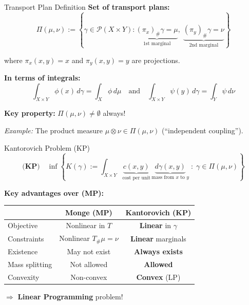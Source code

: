 \documentclass[aspectratio=169]{beamer}
\newcommand{\Pp}{\mathcal{P}}
\begin{document}
\begin{frame}{Transport Plan Definition}
\textbf{Set of transport plans:}
\[
\boxed{\Pi(\mu, \nu) := \left\{ \gamma \in \Pp(X \times Y) : \underbrace{(\pi_x)_\# \gamma = \mu}_{\text{1st marginal}}, \; \underbrace{(\pi_y)_\# \gamma = \nu}_{\text{2nd marginal}} \right\}}
\]

\vspace{0.3cm}
where $\pi_x(x,y) = x$ and $\pi_y(x,y) = y$ are projections.

\vspace{0.3cm}
\textbf{In terms of integrals:}
\[
\int_{X \times Y} \phi(x) \, d\gamma = \int_X \phi \, d\mu \quad \text{and} \quad \int_{X \times Y} \psi(y) \, d\gamma = \int_Y \psi \, d\nu
\]

\vspace{0.3cm}
\textbf{Key property:} $\Pi(\mu,\nu) \neq \emptyset$ always!

\vspace{0.2cm}
\textit{Example:} The product measure $\mu \otimes \nu \in \Pi(\mu,\nu)$ (``independent coupling'').
\end{frame}

\begin{frame}{Kantorovich Problem (KP)}
\[
\boxed{\textbf{(KP)} \quad \inf \left\{ K(\gamma) := \int_{X \times Y} \underbrace{c(x,y)}_{\text{cost per unit}} \, \underbrace{d\gamma(x,y)}_{\text{mass from } x \text{ to } y} \;:\; \gamma \in \Pi(\mu, \nu) \right\}}
\]

\vspace{0.4cm}
\textbf{Key advantages over (MP):}

\begin{center}
\begin{tabular}{l|c|c}
& \textbf{Monge (MP)} & \textbf{Kantorovich (KP)} \\
\hline
Objective & Nonlinear in $T$ & \textbf{Linear} in $\gamma$ \\
Constraints & Nonlinear $T_\#\mu = \nu$ & \textbf{Linear} marginals \\
Existence & May not exist & \textbf{Always exists} \\
Mass splitting & Not allowed & \textbf{Allowed} \\
Convexity & Non-convex & \textbf{Convex} (LP)
\end{tabular}
\end{center}

\vspace{0.3cm}
$\Rightarrow$ \textbf{Linear Programming} problem!
\end{frame}
\end{document}
